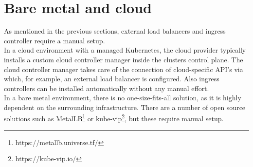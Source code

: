 \section{Bare metal and cloud}

As mentioned in the previous sections, external load balancers and ingress controller require a manual setup.
\\
In a cloud environment with a managed Kubernetes, the cloud provider typically installs a custom cloud controller manager inside the clusters control plane.
The cloud controller manager takes care of the connection of cloud-specific API's via which, for example, an external load balancer is configured.
Also ingress controllers can be installed automatically without any manual effort.
\\
In a bare metal environment, there is no one-size-fits-all solution, as it is highly dependent on the surrounding infrastructure.
There are a number of open source solutions such as MetalLB\footnote{https://metallb.universe.tf/} or kube-vip\footnote{https://kube-vip.io/}, but these require manual setup.
